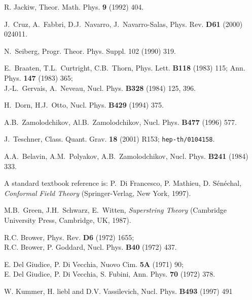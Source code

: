 \documentclass[a4paper,aps,prd,twocolumn,groupedaddress]{revtex4}
\begin{document}
\begin{thebibliography}{99}
 R. Jackiw, Theor. Math. Phys. {\bf 9} (1992) 404.

 J.~Cruz, A.~Fabbri, D.J.~Navarro, J.~Navarro-Salas,
Phys. Rev. {\bf D61} (2000) 024011.

 N.~Seiberg, Progr. Theor. Phys. Suppl. 102 (1990) 
319.

 E.~Braaten, T.L.~Curtright, C.B.~Thorn,
Phys. Lett. \textbf{B118} (1983) 115; Ann. Phys. \textbf{147} (1983)
365;\\
J.-L.~Gervais, A.~Neveau, Nucl. Phys. \textbf{B328} (1984) 125, 
396.

 H.~Dorn, H.J.~Otto, Nucl. Phys. \textbf{B429} (1994) 375.

 A.B.~Zamolodchikov, Al.B.~Zamolodchikov,
Nucl. Phys. \textbf{B477} (1996) 577.

 J.~Teschner, Class. Quant. Grav. \textbf{18} (2001)
R153; \texttt{hep-th/0104158}.

 A.A.~Belavin, A.M.~Polyakov, A.B.~Zamolodchikov,
Nucl. Phys. \textbf{B241} (1984) 333.

 A standard textbook reference is: P.~Di Francesco,
P. Mathieu, D. S\'en\'echal, \emph{Conformal Field Theory}
(Springer-Verlag, New York, 1997).

 M.B.~Green, J.H.~Schwarz, E.~Witten, 
\emph{Superstring
Theory} (Cambridge University Press, Cambridge, UK, 1987).

 R.C. Brower, Phys. Rev. {\bf D6} (1972) 1655;\\
R.C. Brower, P. Goddard, Nucl. Phys. {\bf B40} (1972) 437.

 E. Del Giudice, P. Di Vecchia, Nuovo Cim. {\bf 5A}
(1971) 90;\\
E. Del Giudice, P. Di Vecchia, S. Fubini, Ann. Phys. {\bf
70} (1972) 378.

W. Kummer, H. liebl and D.V. Vassilevich, Nucl. Phys.  {\bf B493} (1997) 491
\end{thebibliography}
\end{document}
